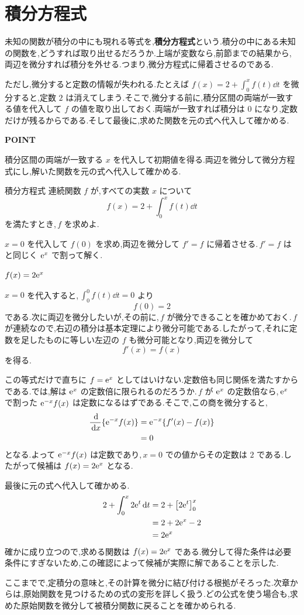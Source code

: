 \section{積分方程式}\label{節:積分方程式}
未知の関数が積分の中にも現れる等式を,\textbf{積分方程式}という.積分の中にある未知の関数を,どうすれば取り出せるだろうか.上端が変数なら,前節までの結果から,両辺を微分すれば積分を外せる.つまり,微分方程式に帰着させるのである.

ただし,微分すると定数の情報が失われる.たとえば $f(x)=2+\int_0^x f(t)\dd t$ を微分すると,定数 $2$ は消えてしまう.そこで,微分する前に,積分区間の両端が一致する値を代入して $f$ の値を取り出しておく.両端が一致すれば積分は $0$ になり,定数だけが残るからである.そして最後に,求めた関数を元の式へ代入して確かめる.

\begin{bookpoint}
\textbf{POINT}\par
積分区間の両端が一致する $x$ を代入して初期値を得る.両辺を微分して微分方程式にし,解いた関数を元の式へ代入して確かめる.
\end{bookpoint}

\begin{example}{積分方程式}
連続関数 $f$ が,すべての実数 $x$ について
\[
 f(x)=2+\int_0^x f(t)\dd t
\]
を満たすとき,\,$f$ を求めよ.
\end{example}
$x=0$ を代入して $f(0)$ を求め,両辺を微分して $f'=f$ に帰着させる.\,$f'=f$ はと同じく $\mathrm{e}^x$ で割って解く.

$f(x)=2\mathrm{e}^x$

$x=0$ を代入すると,\,$\int_0^0f(t)\dd t=0$ より
\[
 f(0)=2
\]
である.次に両辺を微分したいが,その前に,\,$f$ が微分できることを確かめておく.\,$f$ が連続なので,右辺の積分は基本定理により微分可能である.したがって,それに定数を足したものに等しい左辺の $f$ も微分可能となり,両辺を微分して
\[
 f'(x)=f(x)
\]
を得る.

この等式だけで直ちに $f=\mathrm{e}^x$ としてはいけない.定数倍も同じ関係を満たすからである.では,解は $\mathrm{e}^x$ の定数倍に限られるのだろうか.\,$f$ が $\mathrm{e}^x$ の定数倍なら,\,$\mathrm{e}^x$ で割った $\mathrm{e}^{-x}f(x)$ は定数になるはずである.そこで,この商を微分すると,
\begin{align*}
 \frac{\,\mathrm{d}}{\,\mathrm{d} x}\{\mathrm{e}^{-x}f(x)\}
 &=\mathrm{e}^{-x}\{f'(x)-f(x)\}\\
 &=0
\end{align*}
となる.よって $\mathrm{e}^{-x}f(x)$ は定数であり,\,$x=0$ での値からその定数は $2$ である.したがって候補は $f(x)=2\mathrm{e}^x$ となる.

最後に元の式へ代入して確かめる.
\begin{align*}
 2+\int_0^x2\mathrm{e}^t\,\mathrm{d} t
 &=2+\left[2\mathrm{e}^t\right]_0^x\\
 &=2+2\mathrm{e}^x-2\\
 &=2\mathrm{e}^x
\end{align*}
確かに成り立つので,求める関数は $f(x)=2\mathrm{e}^x$ である.微分して得た条件は必要条件にすぎないため,この確認によって候補が実際に解であることを示した.

ここまでで,定積分の意味と,その計算を微分に結び付ける根拠がそろった.次章からは,原始関数を見つけるための式の変形を詳しく扱う.どの公式を使う場合も,求めた原始関数を微分して被積分関数に戻ることを確かめられる.
